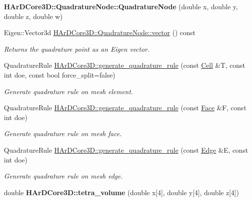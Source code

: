 \begin{DoxyCompactItemize}
\item 
\mbox{\label{group__Quadratures_ga7a185c689ce9f635e803694bd0e8d2e7}} 
{\bfseries H\+Ar\+D\+Core3\+D\+::\+Quadrature\+Node\+::\+Quadrature\+Node} (double x, double y, double z, double w)
\item 
\mbox{\label{group__Quadratures_gac0d94c3725c0502056333f314fb48fc9}} 
Eigen\+::\+Vector3d \hyperlink{group__Quadratures_gac0d94c3725c0502056333f314fb48fc9}{H\+Ar\+D\+Core3\+D\+::\+Quadrature\+Node\+::vector} () const
\begin{DoxyCompactList}\small\item\em Returns the quadrature point as an Eigen vector. \end{DoxyCompactList}\item 
Quadrature\+Rule \hyperlink{group__Quadratures_ga18d0a2cf574bef7d6e83760de2f38152}{H\+Ar\+D\+Core3\+D\+::generate\+\_\+quadrature\+\_\+rule} (const \hyperlink{classHArDCore3D_1_1Cell}{Cell} \&T, const int doe, const bool force\+\_\+split=false)
\begin{DoxyCompactList}\small\item\em Generate quadrature rule on mesh element. \end{DoxyCompactList}\item 
Quadrature\+Rule \hyperlink{group__Quadratures_gae0e89136814758912e6e93fa0a260bd6}{H\+Ar\+D\+Core3\+D\+::generate\+\_\+quadrature\+\_\+rule} (const \hyperlink{classHArDCore3D_1_1Face}{Face} \&F, const int doe)
\begin{DoxyCompactList}\small\item\em Generate quadrature rule on mesh face. \end{DoxyCompactList}\item 
Quadrature\+Rule \hyperlink{group__Quadratures_ga1516d2ddf96226cbcbacf93675e6678f}{H\+Ar\+D\+Core3\+D\+::generate\+\_\+quadrature\+\_\+rule} (const \hyperlink{classHArDCore3D_1_1Edge}{Edge} \&E, const int doe)
\begin{DoxyCompactList}\small\item\em Generate quadrature rule on mesh edge. \end{DoxyCompactList}\item 
\mbox{\label{group__Quadratures_ga721ceca09ec55725a59f484412041546}} 
double {\bfseries H\+Ar\+D\+Core3\+D\+::tetra\+\_\+volume} (double x\mbox{[}4\mbox{]}, double y\mbox{[}4\mbox{]}, double z\mbox{[}4\mbox{]})

\end{DoxyCompactItemize}
